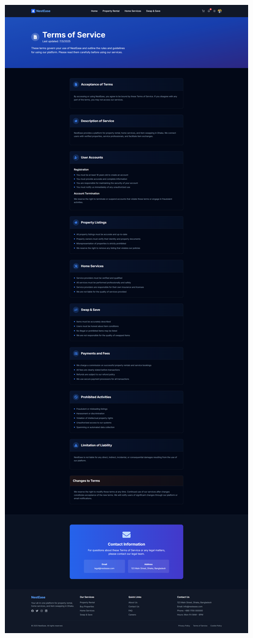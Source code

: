 \documentclass[conference]{IEEEtran}
\begin{document}
\begin{center}
\begin{minipage}[t]{0.45\textwidth}
\end{minipage} \hfill
\begin{minipage}[t]{0.45\textwidth}
\includegraphics[width=\linewidth]{Project Screenshot/Terms of Services.png}
\end{minipage}


\end{center}
\end{document}
